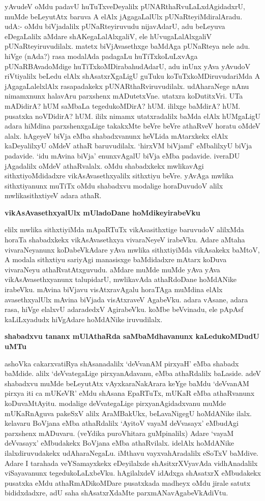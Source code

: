 \noindent
yAvudeV oMdu padavU huTuTxveDeyalilx pUNARthaRvuLaLxdAgidadxrU, muMde beLeyutAtx baruva A elAlx jAgagaLalUlx pUNaRteyiMdiralAradu. udA:- oMdu biVjadalilx pUNaRteyiruvudu nija\-vAdarU, adu beLeyuva eDegaLalilx aMdare shAKegaLalAlxgaliV, ele hUvugaLalAlxgaliV pUNaRteyiru\-vudilalx. matetx biVjAvasethxge baMdAga pUNaRteya nele adu. hiVge (nAda?) rasa modalAda pada\-gaLu huTiTx\-koLuLxvAga pUNaRBAvadoMdige huTiTxkoMDirabahudAdarU, adu inUnx yAva yAvudoV riVtiyalilx beLedu elAlx shAsatxrXgaLigU guTuku koTuTxkoMDiruvudariMda A jAgagaLalelxlAlx rasapadakekx pUNARthaRviruvudilalx. udAharaNege nAnu nimamxnunx halavAru parxshenx mADutetxVne. utatxra koDu\-titxVri. UTa mADidirA? hUM saMbaLa tegedukoMDirA? hUM. ililxge baMdirA? hUM. pusatxka noVDidirA? hUM. ililx nimamx utatxradalilx baMda elAlx hUMgaLigU adara hiMdina parxshenxgaLige takakxMte beVre beVre athaRveV horatu oMdeV alalx. hAgeyeV biVja eMba shabadxvanunx heVLida mAtarxkekx elAlx kaDeyalilxyU oMdeV athaR baruvudilalx. `hirxVM biVjamf' eMbalilxyU biVja padavide. `idu mAvina\- biVja' enunxvAgalU biVja eMba padavide. iveraDU jAgadalilx oMdeV athaRvalalx. oMdu shabadxkekx mwlika\-vAgi sithxtiyoMdidadxre vikAsAvasethxyalilx sithxtiyu beVre. yAvAga mwlika sithxtiyanunx muTiTx oMdu shabadxvu modalige horaDuvudoV alilx mwlikasithxtiyeV adara athaR.

{\bigskip
\noindent
{\large\bf vikAsAvasethxyalUlx mUladoDane hoMdikeyirabeVku}}\label{page178}
\medskip

\noindent
elilx mwlika sithxtiyiMda mApaRTuTx vikAsasithxtige baruvudoV alilxMda horaTa shabadxkekx vikAsA\-vasethxya vivaraNeyeV irabeVku. Adare aMtaha vivaraNeyanunx koDabeVkAdare yAva mwlika sithxti\-yiMda vikAsakekx baMtoV, A modala sithxtiyu sariyAgi manasisxge baMdidadxre mAtarx koDuva vivara\-Neyu athaRvatAtxguvudu. aMdare muMde muMde yAva yAva vikAsAvasethxyanunx talupidarU, mwlika\-vAda athaRdoDane hoMdANike irabeVku. mAvina biVjavu visAtxravAgalu horaTAga muM\-dina elAlx avasethxyalUlx mAvina biVjada visAtxraveV AgabeVku. adara vAsane, adara rasa, hiVge elalxvU adaradedxV AgirabeVku. koMbe beVvinadu, ele pApAsf kaLiLxyadudx hiVgAdare hoMdANike iruvudilalx.

{\bigskip
\noindent
{\large\bf shabadxvu tananx mUlAthaRda saMbaMdhavanunx kaLedukoMDudU uMTu}}
\medskip

\noindent
ashoVka cakarxvatiRya shAsanadalilx `deVvanAM pirxyaH' eMba shabadx baMdide. alilx `deVvategaLige pirxya\-nAdavanu, eMba athaRdalilx baLaside. adeV shabadxvu muMde beLeyutAtx vAyxkaraNakArara keYge baMdu `deVvanAM pirxya iti ca mUKeVR' eMdu shAsana EpaRTuTx, mUKaR eMba athaRvanunx koDuvaMtA\-yitu. modalige deVvategaLige pirxyanAgidadxvanu muMde mUKaRnAguva pakeSxV alilx AraMBakUkx, beLa\-vaNigegU hoMdANike ilalx. kelavaru BoVjana eMba athaRdalilx `AyitoV vayaM deVvasayx' eMbu\-dAgi parxshenx mADuvaru. (veYdika puroVhitara guMpinalilx) Adare `vayaM deVvasayx' eMbudakekx BoVjana eMba athaRvilalx. idelAlx hoMdANike ilalxdiruvudakekx udAharaNegaLu. iMthavu vayxvahAradalilx eSoTxV baMdive. Adare I tarahada veYSamayxkekx eDeyilalxde shAsitxrXVyavAda vidhAnadalilx viSayavanunx tegedu\-koLaLxbeVku. hAgilalxdeV idAdxga shAsatxrX eMbudakekx pusatxka eMdu athaRmADikoMDare pusatxkada madheyx oMdu jirale satutx bididxdadxre, adU saha shAsatxrXdaMte parxmANavAgabeVkAdiVtu.


